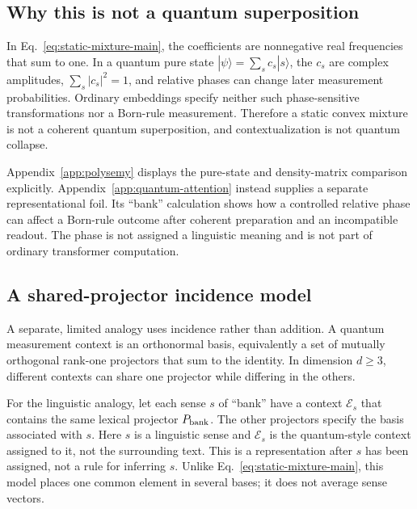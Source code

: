 \documentclass[
  aps,
  reprint,
  superscriptaddress,
  floatfix,
  nofootinbib,
  longbibliography
]{revtex4-2}
\begin{document}
\subsection{Why this is not a quantum superposition}

In Eq.~\eqref{eq:static-mixture-main}, the coefficients are nonnegative real
frequencies that sum to one.  In a quantum pure state
$|\psi\rangle=\sum_s c_s|s\rangle$, the $c_s$ are complex amplitudes,
$\sum_s|c_s|^2=1$, and relative phases can change later measurement
probabilities.  Ordinary embeddings specify neither such phase-sensitive
transformations nor a Born-rule measurement.  Therefore a static convex
mixture is not a coherent quantum superposition, and contextualization is not
quantum collapse.

Appendix~\ref{app:polysemy} displays the pure-state and density-matrix
comparison explicitly.  Appendix~\ref{app:quantum-attention} instead supplies
a separate representational foil.  Its ``bank'' calculation shows how a
controlled relative phase can affect a Born-rule outcome after coherent
preparation and an incompatible readout.  The phase is not assigned a
linguistic meaning and is not part of ordinary transformer computation.

\subsection{A shared-projector incidence model}

A separate, limited analogy uses incidence rather than addition.  A
quantum measurement context is an orthonormal basis, equivalently a set of
mutually orthogonal rank-one projectors that sum to the identity.  In
dimension $d\geq3$, different contexts can share one projector while differing
in the others.

For the linguistic analogy, let each sense $s$ of ``bank'' have a context
$\mathcal E_s$ that contains the same lexical projector $P_{\rm bank}$.  The
other projectors specify the basis associated with $s$.  Here $s$ is a
linguistic sense and $\mathcal E_s$ is the quantum-style context assigned to
it, not the surrounding text.  This is a representation after $s$ has been
assigned, not a rule for inferring $s$.  Unlike
Eq.~\eqref{eq:static-mixture-main}, this model places one common element in
several bases; it does not average sense vectors.
\end{document}
